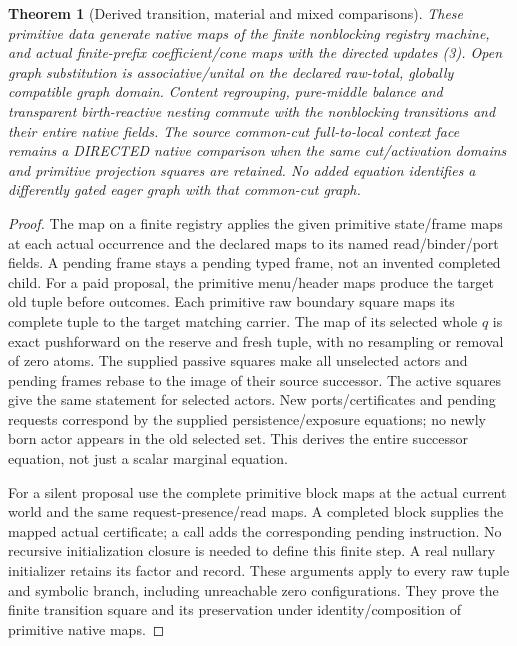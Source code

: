 \documentclass[11pt]{article}\usepackage{amsmath,amssymb,amsthm}
\newtheorem{theorem}{Theorem}\newtheorem{proposition}{Proposition}
\begin{document}
\begin{theorem}[Derived transition, material and mixed comparisons]
These primitive data generate native maps of the finite nonblocking registry machine, and actual finite-prefix coefficient/cone maps with the directed updates (3). Open graph substitution is associative/unital on the declared raw-total, globally compatible graph domain. Content regrouping, pure-middle balance and transparent birth-reactive nesting commute with the nonblocking transitions and their entire native fields. The source common-cut full-to-local context face remains a DIRECTED native comparison when the same cut/activation domains and primitive projection squares are retained. No added equation identifies a differently gated eager graph with that common-cut graph.
\end{theorem}
\begin{proof}
The map on a finite registry applies the given primitive state/frame maps at each actual occurrence and the declared maps to its named read/binder/port fields. A pending frame stays a pending typed frame, not an invented completed child. For a paid proposal, the primitive menu/header maps produce the target old tuple before outcomes. Each primitive raw boundary square maps its complete tuple to the target matching carrier. The map of its selected whole $q$ is exact pushforward on the reserve and fresh tuple, with no resampling or removal of zero atoms. The supplied passive squares make all unselected actors and pending frames rebase to the image of their source successor. The active squares give the same statement for selected actors. New ports/certificates and pending requests correspond by the supplied persistence/exposure equations; no newly born actor appears in the old selected set. This derives the entire successor equation, not just a scalar marginal equation.

For a silent proposal use the complete primitive block maps at the actual current world and the same request-presence/read maps. A completed block supplies the mapped actual certificate; a call adds the corresponding pending instruction. No recursive initialization closure is needed to define this finite step. A real nullary initializer retains its factor and record. These arguments apply to every raw tuple and symbolic branch, including unreachable zero configurations. They prove the finite transition square and its preservation under identity/composition of primitive native maps.


\end{proof}
\end{document}
